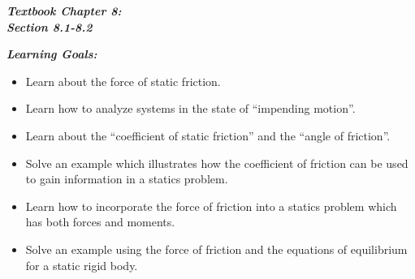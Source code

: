 \documentclass{seminar}
\begin{document}






\setlength{\textwidth}{6in}
\setlength{\topmargin}{-0.25in}

\setlength{\textheight}{8in}




\begin{slide}
\centerline{\huge\bf\red\it Textbook Chapter 8: \\Section 8.1-8.2}
\end{slide}



\begin{slide}
{\bf\it \red Learning Goals:}

\begin{itemize}
\item{}Learn about the force of static friction.
\item{}Learn how to analyze systems in the state of ``impending motion''.
\item{}Learn about the ``coefficient of static friction'' and 
the ``angle of friction''.
\item{}Solve an example which illustrates how the coefficient of
friction can be used to gain information in a statics problem.
\item{}Learn how to incorporate the force of friction into a 
statics problem which has both forces and moments.
\item{}Solve an example using the force of friction and
the equations of equilibrium for a static rigid body.
\end{itemize}
\vfill
\end{slide}
\end{document}
